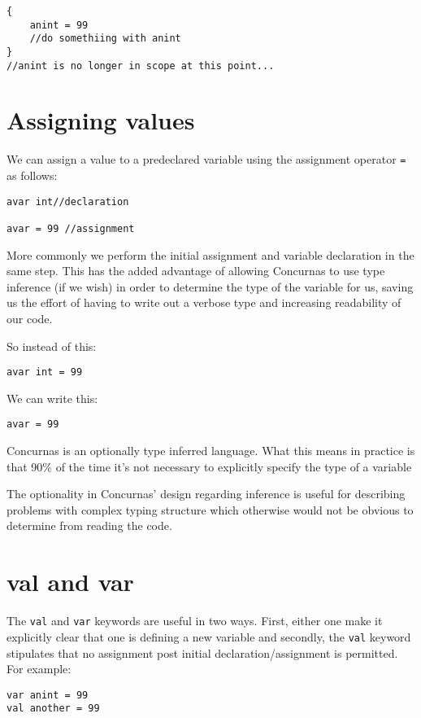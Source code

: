 \documentclass[conc-doc]{subfiles}
\begin{document}
\begin{lstlisting}
{
	anint = 99
	//do somethiing with anint
}
//anint is no longer in scope at this point...
\end{lstlisting}

\section{Assigning values}
We can assign a value to a predeclared variable using the assignment operator \lstinline{=} as follows:

\begin{lstlisting}
avar int//declaration

avar = 99 //assignment
\end{lstlisting}

More commonly we perform the initial assignment and variable declaration in the same step. This has the added advantage of allowing Concurnas to use type inference (if we wish) in order to determine the type of the variable for us, saving us the effort of having to write out a verbose type and increasing readability of our code. 

So instead of this:
\begin{lstlisting}
avar int = 99
\end{lstlisting}

We can write this:

\begin{lstlisting}
avar = 99
\end{lstlisting}

Concurnas is an optionally type inferred language. What this means in practice is that 90\% of the time it's not necessary to explicitly specify the type of a variable

The optionality in Concurnas' design regarding inference is useful for describing problems with complex typing structure which otherwise would not be obvious to determine from reading the code.

\section{val and var}
The \lstinline{val} and \lstinline{var} keywords are useful in two ways. First, either one make it explicitly clear that one is defining a new variable and secondly, the \lstinline{val} keyword stipulates that no assignment post initial declaration/assignment is permitted. For example:

\begin{lstlisting}
var anint = 99
val another = 99
\end{lstlisting}
\end{document}
